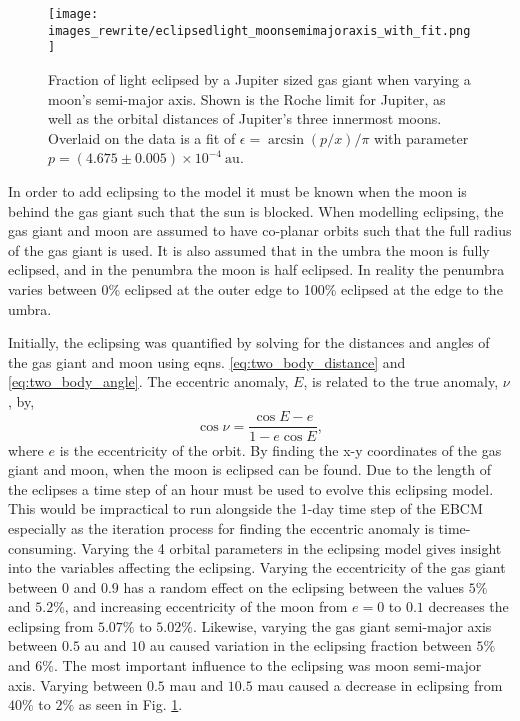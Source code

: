 \documentclass[12pt, onecolumn]{revtex4-2}    %
\begin{document}
\begin{figure}[t]
  \texttt{[image: images\_rewrite/eclipsedlight\_moonsemimajoraxis\_with\_fit.png]}
  \caption{
    Fraction of light eclipsed by a Jupiter sized gas giant when varying a moon's semi-major axis.
    Shown is the Roche limit for Jupiter, as well as the orbital distances of Jupiter's three innermost moons.
    Overlaid on the data is a fit of $\epsilon = \arcsin(p/x)/\pi$ with parameter $p = (4.675\pm0.005)\times 10^{-4}\ \text{au}$.
  }
  \label{fig:quantitative_eclipsing_moon_semimajor_axis}
\end{figure}

In order to add eclipsing to the model it must be known when the moon is behind the gas giant such that the sun is blocked.
When modelling eclipsing, the gas giant and moon are assumed to have co-planar orbits such that the full radius of the gas giant is used.
It is also assumed that in the umbra the moon is fully eclipsed, and in the penumbra the moon is half eclipsed.
In reality the penumbra varies between 0\% eclipsed at the outer edge to 100\% eclipsed at the edge to the umbra.

Initially, the eclipsing was quantified by solving for the distances and angles of the gas giant and moon using eqns. \eqref{eq:two_body_distance} and \eqref{eq:two_body_angle}.
The eccentric anomaly, $E$, is related to the true anomaly, $\nu$, by,
\begin{equation}
  \cos \nu =  \frac{\cos E - e}{1 - e \cos E},
  \label{eq:true_anomaly}
\end{equation}
where $e$ is the eccentricity of the orbit.
By finding the x-y coordinates of the gas giant and moon, when the moon is eclipsed can be found.
Due to the length of the eclipses a time step of an hour must be used to evolve this eclipsing model.
This would be impractical to run alongside the 1-day time step of the EBCM especially as the iteration process for finding the eccentric anomaly is time-consuming.
Varying the 4 orbital parameters in the eclipsing model gives insight into the variables affecting the eclipsing.
Varying the eccentricity of the gas giant between $0$ and $0.9$ has a random effect on the eclipsing between the values $5\%$ and $5.2\%$, and increasing eccentricity of the moon from $e=0$ to $0.1$ decreases the eclipsing from $5.07\%$ to $5.02\%$.
Likewise, varying the gas giant semi-major axis between $0.5$ au and $10$ au caused variation in the eclipsing fraction between $5\%$ and $6\%$. 
The most important influence to the eclipsing was moon semi-major axis.
Varying between $0.5$ mau and $10.5$ mau caused a decrease in eclipsing from $40\%$ to $2\%$ as seen in Fig. \ref{fig:quantitative_eclipsing_moon_semimajor_axis}.
\end{document}
